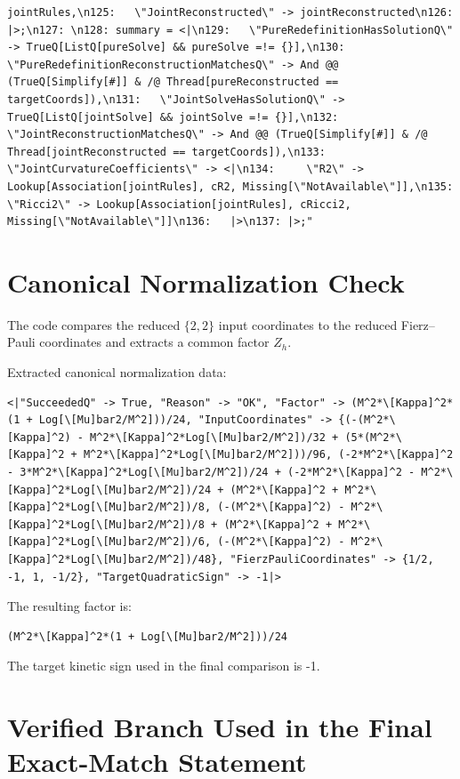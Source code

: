 \documentclass[11pt]{article}
\begin{document}
\begin{verbatim}
jointRules,\n125:   \"JointReconstructed\" -> jointReconstructed\n126: |>;\n127: \n128: summary = <|\n129:   \"PureRedefinitionHasSolutionQ\" -> TrueQ[ListQ[pureSolve] && pureSolve =!= {}],\n130:   \"PureRedefinitionReconstructionMatchesQ\" -> And @@ (TrueQ[Simplify[#]] & /@ Thread[pureReconstructed == targetCoords]),\n131:   \"JointSolveHasSolutionQ\" -> TrueQ[ListQ[jointSolve] && jointSolve =!= {}],\n132:   \"JointReconstructionMatchesQ\" -> And @@ (TrueQ[Simplify[#]] & /@ Thread[jointReconstructed == targetCoords]),\n133:   \"JointCurvatureCoefficients\" -> <|\n134:     \"R2\" -> Lookup[Association[jointRules], cR2, Missing[\"NotAvailable\"]],\n135:     \"Ricci2\" -> Lookup[Association[jointRules], cRicci2, Missing[\"NotAvailable\"]]\n136:   |>\n137: |>;"
\end{verbatim}

\section{Canonical Normalization Check}

The code compares the reduced $\{2,2\}$ input coordinates to the reduced Fierz--Pauli coordinates and extracts a common factor $Z_h$.

Extracted canonical normalization data:

\begin{verbatim}
<|"SucceededQ" -> True, "Reason" -> "OK", "Factor" -> (M^2*\[Kappa]^2*(1 + Log[\[Mu]bar2/M^2]))/24, "InputCoordinates" -> {(-(M^2*\[Kappa]^2) - M^2*\[Kappa]^2*Log[\[Mu]bar2/M^2])/32 + (5*(M^2*\[Kappa]^2 + M^2*\[Kappa]^2*Log[\[Mu]bar2/M^2]))/96, (-2*M^2*\[Kappa]^2 - 3*M^2*\[Kappa]^2*Log[\[Mu]bar2/M^2])/24 + (-2*M^2*\[Kappa]^2 - M^2*\[Kappa]^2*Log[\[Mu]bar2/M^2])/24 + (M^2*\[Kappa]^2 + M^2*\[Kappa]^2*Log[\[Mu]bar2/M^2])/8, (-(M^2*\[Kappa]^2) - M^2*\[Kappa]^2*Log[\[Mu]bar2/M^2])/8 + (M^2*\[Kappa]^2 + M^2*\[Kappa]^2*Log[\[Mu]bar2/M^2])/6, (-(M^2*\[Kappa]^2) - M^2*\[Kappa]^2*Log[\[Mu]bar2/M^2])/48}, "FierzPauliCoordinates" -> {1/2, -1, 1, -1/2}, "TargetQuadraticSign" -> -1|>
\end{verbatim}

The resulting factor is:

\begin{verbatim}
(M^2*\[Kappa]^2*(1 + Log[\[Mu]bar2/M^2]))/24
\end{verbatim}

The target kinetic sign used in the final comparison is -1.

\section{Verified Branch Used in the Final Exact-Match Statement}
\end{document}
